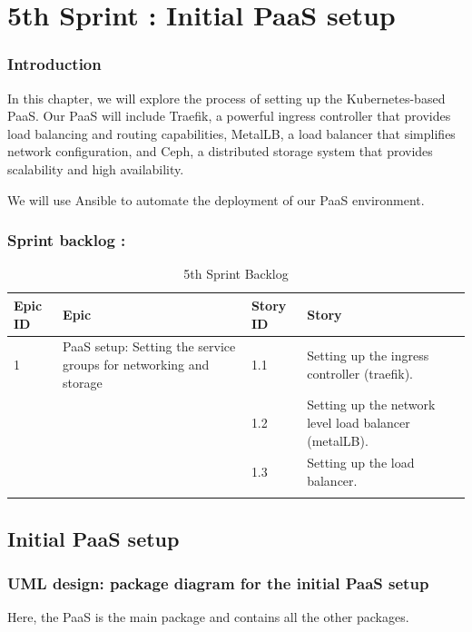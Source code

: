 \graphicspath{{./assets/}}
\setcounter{mtc}{7}
\chapter{5th Sprint : Initial PaaS setup}

\minitoc
\newpage
\subsection*{Introduction}
In this chapter, we will explore the process of setting up the Kubernetes-based PaaS. Our PaaS will include Traefik, a powerful ingress controller that provides load balancing and routing capabilities, MetalLB, a load balancer that simplifies network configuration, and Ceph, a distributed storage system that provides scalability and high availability.

We will use Ansible to automate the deployment of our PaaS environment.

\subsection{Sprint backlog :}

\begin{longtable}[H]{|m{1.5cm}|m{3cm}|m{1.5cm}|m{9cm}|}
\hline
{\textbf{Epic ID}} & {\textbf{Epic}} & {\textbf{Story ID}} & {\textbf{Story}}\\
\hline
1  & PaaS setup: Setting the service groups for networking and storage	 &  1.1	 &  Setting up the ingress controller (traefik).\\
\cline{3-4}
& & 1.2 & Setting up the network level load balancer (metalLB). \\
\cline{3-4}
& & 1.3	& Setting up the load balancer. \\
\cline{3-4}
\hline
\caption{5th Sprint Backlog}
\end{longtable}

\section{Initial PaaS setup}
\subsection{UML design: package diagram for the initial PaaS setup}

Here, the PaaS is the main package and contains all the other packages.


